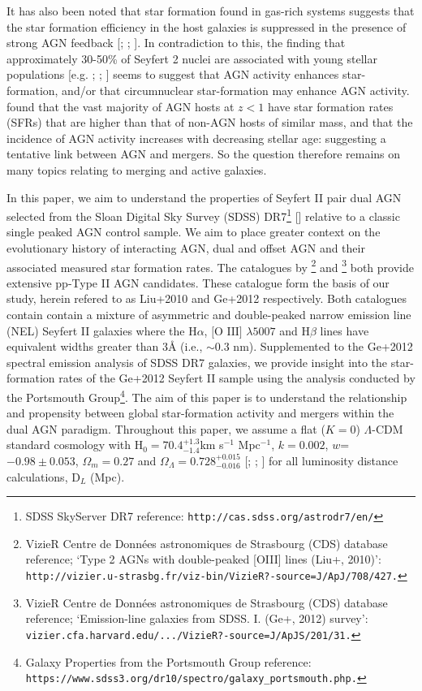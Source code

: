 It has also been noted that star formation found in gas-rich systems suggests that the star formation efficiency in the host galaxies is suppressed in the presence of strong AGN feedback [\cite{1999ApSS.266..207M}; \cite{2004AAS...204.4905B}; \cite{Di_Matteo_2005}]. In contradiction to this, the finding that approximately 30-50\% of Seyfert 2 nuclei are associated with young stellar populations [e.g. \cite{Delgado_2001}; \cite{Storchi_Bergmann_2001}; \cite{Sarzi_2006}] seems to suggest that AGN activity enhances star-formation, and/or that circumnuclear star-formation may enhance AGN activity. \cite{Silverman_2009} found that the vast majority of AGN hosts at $z<1$ have star formation rates (SFRs) that are higher than that of non-AGN hosts of similar mass, and that the incidence of AGN activity increases with decreasing stellar age: suggesting a tentative link between AGN and mergers. So the question therefore remains on many topics relating to merging and active galaxies.

In this paper, we aim to understand the properties of Seyfert II pair dual AGN selected from the Sloan Digital Sky Survey (SDSS) DR7\footnote{\tiny{SDSS SkyServer DR7 reference: \tt{http://cas.sdss.org/astrodr7/en/}}} [\cite{2009ApJS..182..543A}] relative to a classic single peaked AGN control sample. We aim to place greater context on the evolutionary history of interacting AGN, dual and offset AGN and their associated measured star formation rates. The catalogues by \cite{Liu_2009}\footnote{\tiny{VizieR Centre de Donn\'{e}es astronomiques de Strasbourg (CDS) database reference; `Type 2 AGNs with double-peaked [OIII] lines (Liu+, 2010)': \tt{http://vizier.u-strasbg.fr/viz-bin/VizieR?-source=J/ApJ/708/427}.}} and \cite{Ge_Hu_Wang_Bai_Zhang_2012}\footnote{\tiny{VizieR Centre de Donn\'{e}es astronomiques de Strasbourg (CDS) database reference; `Emission-line galaxies from SDSS. I. (Ge+, 2012) survey': \tt{vizier.cfa.harvard.edu/.../VizieR?-source=J/ApJS/201/31}.}} both provide extensive pp-Type II AGN candidates. These catalogue form the basis of our study, herein refered to as Liu+2010 and Ge+2012 respectively. Both catalogues contain contain a mixture of asymmetric and double-peaked narrow emission line (NEL) Seyfert II galaxies where the $\text{H}\alpha$, $\text{[O III]}$ $\lambda{5007}$ and $\text{H}\beta$ lines have equivalent widths greater than 3\AA{ }(i.e., $\sim{0.3}$ nm). Supplemented to the Ge+2012 spectral emission analysis of SDSS DR7 galaxies, we provide insight into the star-formation rates of the Ge+2012 Seyfert II sample using the analysis conducted by the Portsmouth Group\footnote{\tiny{Galaxy Properties from the Portsmouth Group reference: \tt{https://www.sdss3.org/dr10/spectro/galaxy_portsmouth.php}.}}. The aim of this paper is to understand the relationship and propensity between global star-formation activity and mergers within the dual AGN paradigm. Throughout this paper, we assume a flat ($K=0$) $\Lambda$-CDM standard cosmology with $\text{H}_0={70.4}^{+1.3}_{-1.4}$km s$^{−1}$ Mpc$^{−1}$, $k={0.002}$, $w$=$-0.98\pm{0.053}$, ${\Omega_{m}}={0.27}$ and ${\Omega_{\Lambda}}={{0.728}^{+0.015}_{-0.016}}$ [\cite{Spergel_2003}; \cite{Reid_2010}; \cite{Jarosik_2011}] for all luminosity distance calculations, $\text{D}_L$ (Mpc).
